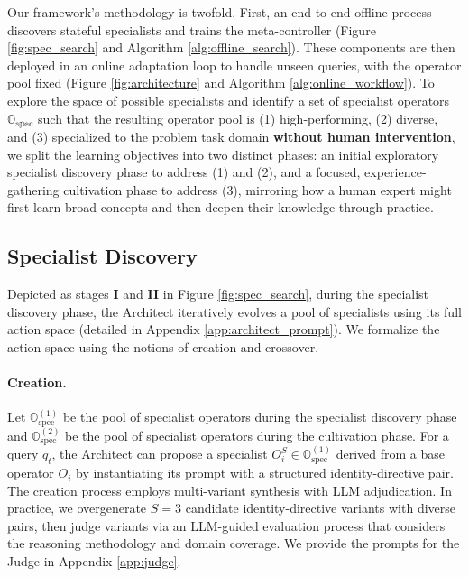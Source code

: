 \documentclass{article} %
\begin{document}
Our framework's methodology is twofold. First, an end-to-end offline process discovers stateful specialists and trains the meta-controller (Figure \ref{fig:spec_search} and Algorithm \ref{alg:offline_search}). These components are then deployed in an online adaptation loop to handle unseen queries, with the operator pool fixed (Figure \ref{fig:architecture} and Algorithm \ref{alg:online_workflow}). To explore the space of possible specialists and identify a set of specialist operators \(\mathbb{O_\text{spec}}\) such that the resulting operator pool is (1) high-performing, (2) diverse, and (3) specialized to the problem task domain \textbf{without human intervention}, we split the learning objectives into two distinct phases: an initial exploratory specialist discovery phase to address (1) and (2), and a focused, experience-gathering cultivation phase to address (3), mirroring how a human expert might first learn broad concepts and then deepen their knowledge through practice.

\subsection{Specialist Discovery}
\label{subsec:spec_search}

Depicted as stages \textbf{I} and \textbf{II} in Figure \ref{fig:spec_search}, during the specialist discovery phase, the Architect iteratively evolves a pool of specialists using its full action space (detailed in Appendix \ref{app:architect_prompt}). We formalize the action space using the notions of creation and crossover.

\paragraph{Creation.} Let  $\mathbb{O}_\text{spec}^{(1)}$ be the pool of specialist operators during the specialist discovery phase and $\mathbb{O}_\text{spec}^{(2)}$ be the pool of specialist operators during the cultivation phase. For a query \(q_t\), the Architect can propose a specialist \(O_i^S \in \mathbb{O}_\text{spec}^{(1)}\) derived from a base operator \(O_i\) by instantiating its prompt with a structured identity-directive pair. The creation process employs multi-variant synthesis with LLM adjudication. In practice, we overgenerate $S=3$ candidate identity-directive variants with diverse pairs, then judge variants via an LLM-guided evaluation process that considers the reasoning methodology and domain coverage. We provide the prompts for the Judge in Appendix \ref{app:judge}.
\end{document}

